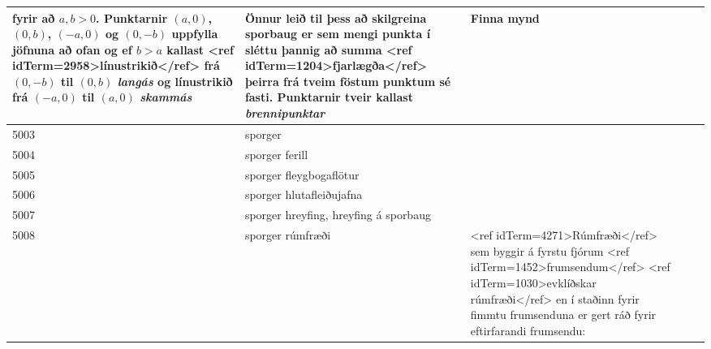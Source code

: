\begin{longtable}{p{}|p{}|p{}|p{}|p{}}
fyrir að $a,b > 0$. Punktarnir $(a,0)$, $(0,b)$, $(-a,0)$ og $(0,-b)$ uppfylla jöfnuna að ofan og ef $b > a$ kallast <ref idTerm=2958>línustrikið</ref> frá $(0,-b)$ til $(0,b)$ \textit{langás} og línustrikið frá $(-a,0)$ til $(a,0)$ \textit{skammás} & Önnur leið til þess að skilgreina sporbaug er sem mengi punkta í sléttu þannig að summa <ref idTerm=1204>fjarlægða</ref> þeirra frá tveim föstum punktum sé fasti. Punktarnir tveir kallast \textit{brennipunktar} & Finna mynd \\
\hline
5003 & sporger &  &  &  \\
\hline
5004 & sporger ferill &  &  &  \\
\hline
5005 & sporger fleygbogaflötur &  &  &  \\
\hline
5006 & sporger hlutafleiðujafna &  &  &  \\
\hline
5007 & sporger hreyfing, hreyfing á sporbaug &  &  &  \\
\hline
5008 & sporger rúmfræði & <ref idTerm=4271>Rúmfræði</ref> sem byggir á fyrstu fjórum <ref idTerm=1452>frumsendum</ref> <ref idTerm=1030>evklíðskar rúmfræði</ref> en í staðinn fyrir fimmtu frumsenduna er gert ráð fyrir eftirfarandi frumsendu:


\end{longtable}
